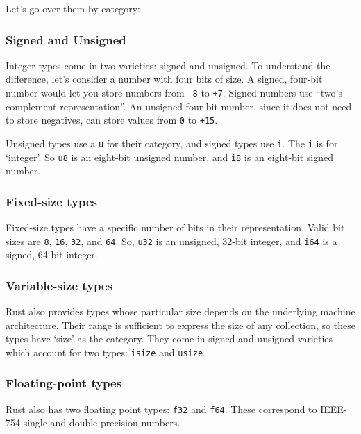 \documentclass[a4paper,]{book}
\begin{document}
Let's go over them by category:

\subsubsection{Signed and Unsigned}\label{signed-and-unsigned}

Integer types come in two varieties: signed and unsigned. To understand
the difference, let's consider a number with four bits of size. A
signed, four-bit number would let you store numbers from \texttt{-8} to
\texttt{+7}. Signed numbers use ``two's complement representation''. An
unsigned four bit number, since it does not need to store negatives, can
store values from \texttt{0} to \texttt{+15}.

Unsigned types use a \texttt{u} for their category, and signed types use
\texttt{i}. The \texttt{i} is for `integer'. So \texttt{u8} is an
eight-bit unsigned number, and \texttt{i8} is an eight-bit signed
number.

\subsubsection{Fixed-size types}\label{fixed-size-types}

Fixed-size types have a specific number of bits in their representation.
Valid bit sizes are \texttt{8}, \texttt{16}, \texttt{32}, and
\texttt{64}. So, \texttt{u32} is an unsigned, 32-bit integer, and
\texttt{i64} is a signed, 64-bit integer.

\subsubsection{Variable-size types}\label{variable-size-types}

Rust also provides types whose particular size depends on the underlying
machine architecture. Their range is sufficient to express the size of
any collection, so these types have `size' as the category. They come in
signed and unsigned varieties which account for two types:
\texttt{isize} and \texttt{usize}.

\subsubsection{Floating-point types}\label{floating-point-types}

Rust also has two floating point types: \texttt{f32} and \texttt{f64}.
These correspond to IEEE-754 single and double precision numbers.
\end{document}
